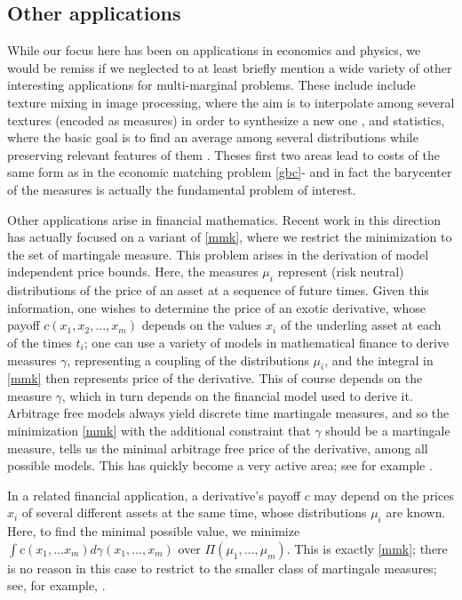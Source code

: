 \documentclass[letter,10pt]{article}
\theoremstyle{dotless}
\begin{document}
\subsection{Other applications}
While our focus here has been on applications in economics and physics, we would be remiss if we neglected to at least briefly mention a wide variety of other interesting applications for multi-marginal problems. These include include texture mixing in image processing, where the aim is to interpolate among several textures (encoded as measures) in order to synthesize a new one \cite{bdpr}, and statistics, where the basic goal is to find an average among several distributions while preserving relevant features of them \cite{BK}.  Theses first two areas lead to costs of the same form as in the economic matching problem \eqref{gbc}- and in fact the barycenter of the measures is actually the fundamental problem of interest.

Other applications arise in financial mathematics. Recent work in this direction has actually focused on a variant of \eqref{mmk}, where we restrict the minimization to the set of martingale measure.  This problem arises in the derivation of model independent price bounds.  Here, the measures $\mu_i$ represent (risk neutral) distributions of the price of an asset at a sequence of future times.  Given this information, one wishes to determine the price of an exotic derivative, whose payoff $c(x_1,x_2,...,x_m)$ depends on the values $x_i$ of the underling asset at each of the times $t_i$; one can use a variety of models in mathematical finance to derive measures $\gamma$, representing a coupling of the distributions $\mu_i$, and the integral in \eqref{mmk} then represents price of the derivative. This of course depends on the measure $\gamma$, which in turn depends on the financial  model used to derive it.  Arbitrage free models always yield discrete time martingale measures, and so the minimization \eqref{mmk} with the additional constraint that $\gamma$ should be a martingale measure, tells us the minimal arbitrage free price of the derivative, among all possible models.  This has quickly become a very active area; see for example \cite{ds3}\cite{ds2}\cite{ght}\cite{hpt}\cite{BeigGriess}\cite{bhlp}\cite{ght}\cite{hltt}.

In a related financial application, a derivative's payoff $c$ may depend on the prices $x_i$ of several different assets at the same time, whose distributions $\mu_i$ are known.  Here, to find the minimal possible value, we minimize $\int c(x_1,...x_m)d\gamma(x_1,...,x_m)$ over $\Pi(\mu_1,...,\mu_m)$.  This is exactly \eqref{mmk}; there is no reason in this case to restrict to the smaller class of martingale measures; see, for example, \cite{pr}\cite{eprwb}.
\end{document}
